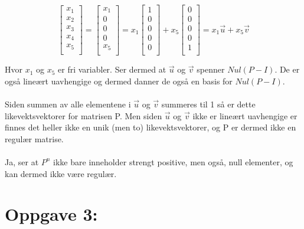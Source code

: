 \documentclass[a4paper, norsk, twoside, 10pt]{article}
\begin{document}
\begin{flushleft}
  \[ \begin{bmatrix}
    x_{1} \\
    x_{2} \\
    x_{3} \\
    x_{4} \\
    x_{5} \\
  \end{bmatrix}
  =
  \begin{bmatrix}
    x_{1} \\
    0 \\
    0 \\
    0 \\
    x_{5}\\
  \end{bmatrix}
  = x_{1}
  \begin{bmatrix}
    1 \\
    0 \\
    0 \\
    0 \\
    0 \\
  \end{bmatrix}
  + x_{5}
  \begin{bmatrix}
    0 \\
    0 \\
    0 \\
    0 \\
    1 \\
  \end{bmatrix}
  = x_{1}\vec{u} + x_{5}\vec{v}
  \]


  Hvor $x_{1}$ og $x_{5}$ er fri variabler. Ser dermed at $\vec{u}$ og $\vec{v}$ spenner $Nul(P-I)$. De er også lineært uavhengige og dermed danner de også en basis for $Nul(P-I)$.
  \ \\ \ \\
  Siden summen av alle elementene i $\vec{u}$ og $\vec{v}$ summeres til 1 så er dette likevektsvektorer for matrisen P. Men siden $\vec{u}$ og $\vec{v}$ ikke er lineært uavhengige er finnes det heller ikke en unik (men to) likevektsvektorer, og P er dermed ikke en regulær matrise.
  \ \\ \ \\
  Ja, ser at $P^{n}$ ikke bare inneholder strengt positive, men også, null elementer, og kan dermed ikke være regulær.
\newpage
  \section*{Oppgave 3:}

  \begin{tikzpicture}[->,>=stealth',shorten >=1pt,auto,node distance=3cm,
      thick,main node/.style={circle,draw,font=\sffamily\Large\bfseries}]


\end{tikzpicture}
\end{flushleft}
\end{document}
